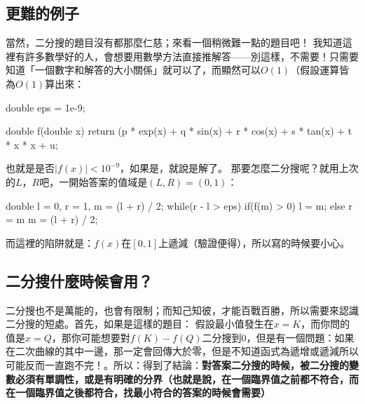 	\subsection{更難的例子}
		當然，二分搜的題目沒有都那麼仁慈；來看一個稍微難一點的題目吧！
		我知道這裡有許多數學好的人，會想要用數學方法直接推解答——別這樣，不需要！只需要知道「一個數字和解答的大小關係」就可以了，而顯然可以$O(1)$（假設運算皆為$O(1)$算出來：
		\begin{C++}
double eps = 1e-9;

double f(double x){
	return (p * exp(x) + q * sin(x) + r * cos(x) + s * tan(x) + t * x * x + u;	
}
		\end{C++}
		也就是是否$|f(x)| < 10^{-9}$，如果是，就說是解了。
		那要怎麼二分搜呢？就用上次的$L$，$R$吧，一開始答案的值域是$(L, R) = (0, 1)$：
		\begin{C++}
double l = 0, r = 1, m = (l + r) / 2;
while(r - l > eps){
	if(f(m) > 0){
		l = m;	
	} else {
		r = m
	}
	m = (l + r) / 2;
}
		\end{C++}
		而這裡的陷阱就是：$f(x)$在$[0, 1]$上遞減（驗證便得），所以寫的時候要小心。
	\subsection{二分搜什麼時候會用？}
		二分搜也不是萬能的，也會有限制；而知己知彼，才能百戰百勝，所以需要來認識二分搜的短處。首先，如果是這樣的題目：
		假設最小值發生在$x = K$，而你問的值是$x = Q$，那你可能想要對$f(K) - f(Q)$二分搜到$0$，但是有一個問題：如果在二次曲線的其中一邊，那一定會回傳大於零，但是不知道函式為遞增或遞減所以可能反而一直跑不完！。所以：得到了結論：\textbf{對答案二分搜的時候，被二分搜的變數必須有單調性，或是有明確的分界（也就是說，在一個臨界值之前都不符合，而在一個臨界值之後都符合，找最小符合的答案的時候會需要）}
